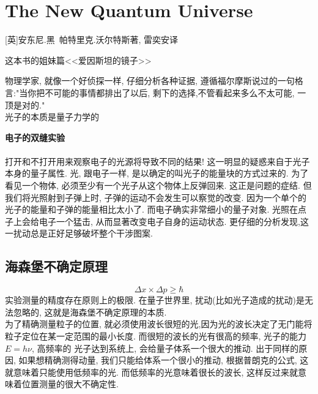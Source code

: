 \chapter{The New Quantum Universe}
[英]安东尼.黑\ 帕特里克.沃尔特斯著, 雷奕安译

这本书的姐妹篇<<爱因斯坦的镜子>>

物理学家, 就像一个好侦探一样, 仔细分析各种证据, 遵循福尔摩斯说过的一句格言:"当你把不可能的事情都排出了以后, 剩下的选择,不管看起来多么不太可能, 一顶是对的."  \\
光子的本质是量子力学的

\textbf{电子的双缝实验}\\
\\
打开和不打开用来观察电子的光源将导致不同的结果! 这一明显的疑惑来自于光子本身的量子属性. 光, 跟电子一样, 是以确定的叫光子的能量块的方式过来的. 为了看见一个物体, 必须至少有一个光子从这个物体上反弹回来. 这正是问题的症结. 但我们将光照射到子弹上时, 子弹的运动不会发生可以察觉的改变. 因为一个单个的光子的能量和子弹的能量相比太小了. 而电子确实非常细小的量子对象. 光照在点子上会给电子一个猛击, 从而显著改变电子自身的运动状态. 更仔细的分析发现,这一扰动总是正好足够破坏整个干涉图案.
\bigskip

\section{海森堡不确定原理}
$$
\Delta x\times \Delta p \geq \hbar
$$
实验测量的精度存在原则上的极限. 在量子世界里, 扰动(比如光子造成的扰动)是无法忽略的, 这就是海森堡不确定原理的本质.\\
为了精确测量粒子的位置, 就必须使用波长很短的光,因为光的波长决定了无门能将粒子定位在某一定范围的最小长度. 而很短的波长的光有很高的频率, 光子的能力$E=h\nu$, 高频率的
光子达到系统上, 会给量子体系一个很大的推动. 出于同样的原因, 如果想精确测得动量, 我们只能给体系一个很小的推动, 根据普朗克的公式, 这就意味着只能使用低频率的光. 而低频率的光意味着很长的波长, 这样反过来就意味着位置测量的很大不确定性.
\bigskip

